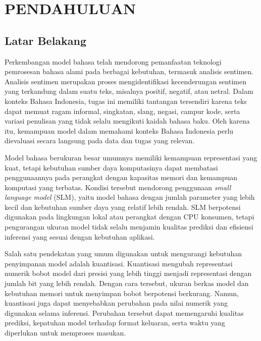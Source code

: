 \chapter{PENDAHULUAN}

\section{Latar Belakang}

Perkembangan model bahasa telah mendorong pemanfaatan teknologi pemrosesan bahasa alami pada berbagai kebutuhan, termasuk analisis sentimen. Analisis sentimen merupakan proses mengidentifikasi kecenderungan sentimen yang terkandung dalam suatu teks, misalnya positif, negatif, atau netral. Dalam konteks Bahasa Indonesia, tugas ini memiliki tantangan tersendiri karena teks dapat memuat ragam informal, singkatan, slang, negasi, campur kode, serta variasi penulisan yang tidak selalu mengikuti kaidah bahasa baku. Oleh karena itu, kemampuan model dalam memahami konteks Bahasa Indonesia perlu dievaluasi secara langsung pada data dan tugas yang relevan.

Model bahasa berukuran besar umumnya memiliki kemampuan representasi yang kuat, tetapi kebutuhan sumber daya komputasinya dapat membatasi penggunaannya pada perangkat dengan kapasitas memori dan kemampuan komputasi yang terbatas. Kondisi tersebut mendorong penggunaan \textit{small language model} (SLM), yaitu model bahasa dengan jumlah parameter yang lebih kecil dan kebutuhan sumber daya yang relatif lebih rendah. SLM berpotensi digunakan pada lingkungan lokal atau perangkat dengan CPU konsumen, tetapi pengurangan ukuran model tidak selalu menjamin kualitas prediksi dan efisiensi inferensi yang sesuai dengan kebutuhan aplikasi.

Salah satu pendekatan yang umum digunakan untuk mengurangi kebutuhan penyimpanan model adalah kuantisasi. Kuantisasi mengubah representasi numerik bobot model dari presisi yang lebih tinggi menjadi representasi dengan jumlah bit yang lebih rendah. Dengan cara tersebut, ukuran berkas model dan kebutuhan memori untuk menyimpan bobot berpotensi berkurang. Namun, kuantisasi juga dapat menyebabkan perubahan pada nilai numerik yang digunakan selama inferensi. Perubahan tersebut dapat memengaruhi kualitas prediksi, kepatuhan model terhadap format keluaran, serta waktu yang diperlukan untuk memproses masukan.

